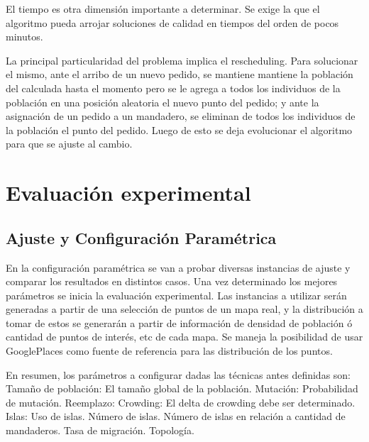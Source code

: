 \documentclass[9pt,conference]{IEEEtran}
\begin{document}
		El tiempo es otra dimensión importante a determinar. Se exige la que el algoritmo pueda arrojar soluciones de calidad en tiempos del orden de pocos minutos.

		La principal particularidad del problema implica el rescheduling. Para solucionar el mismo, ante el arribo de un nuevo pedido, se mantiene mantiene la población del calculada hasta el momento pero se le agrega a todos los individuos de la población en una posición aleatoria el nuevo punto del pedido; y ante la asignación de un pedido a un mandadero, se eliminan de todos los individuos de la población el punto del pedido. Luego de esto se deja evolucionar el algoritmo para que se ajuste al cambio.


	\section{Evaluación experimental}

	\subsection{Ajuste y Configuración Paramétrica}

		En la configuración paramétrica se van a probar diversas instancias de ajuste y comparar los resultados en distintos casos. Una vez determinado los mejores parámetros se inicia la evaluación experimental.
		Las instancias a utilizar serán generadas a partir de una selección de puntos de un mapa real, y la distribución a tomar de estos se generarán a partir de información de densidad de población ó cantidad de puntos de interés, etc de cada mapa. Se maneja la posibilidad de usar GooglePlaces como fuente de referencia para las distribución de los puntos.
		
		En resumen, los parámetros a configurar dadas las técnicas antes definidas son:
			Tamaño de población: El tamaño global de la población.
			Mutación: Probabilidad de mutación.
			Reemplazo:
				Crowding: El delta de crowding debe ser determinado.
			Islas:
				Uso de islas.
				Número de islas.
				Número de islas en relación a cantidad de mandaderos.
				Tasa de migración.
				Topología.
\end{document}
